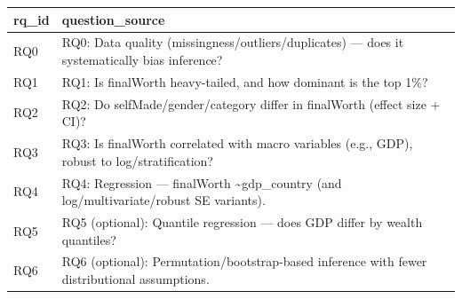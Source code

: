 \begin{tabular}{ll}
\toprule
rq\_id & question\_source \\
\midrule
RQ0 & RQ0: Data quality (missingness/outliers/duplicates) — does it systematically bias inference? \\
RQ1 & RQ1: Is finalWorth heavy-tailed, and how dominant is the top 1\%? \\
RQ2 & RQ2: Do selfMade/gender/category differ in finalWorth (effect size + CI)? \\
RQ3 & RQ3: Is finalWorth correlated with macro variables (e.g., GDP), robust to log/stratification? \\
RQ4 & RQ4: Regression — finalWorth \textasciitilde \space gdp\_country (and log/multivariate/robust SE variants). \\
RQ5 & RQ5 (optional): Quantile regression — does GDP differ by wealth quantiles? \\
RQ6 & RQ6 (optional): Permutation/bootstrap-based inference with fewer distributional assumptions. \\
\bottomrule
\end{tabular}
